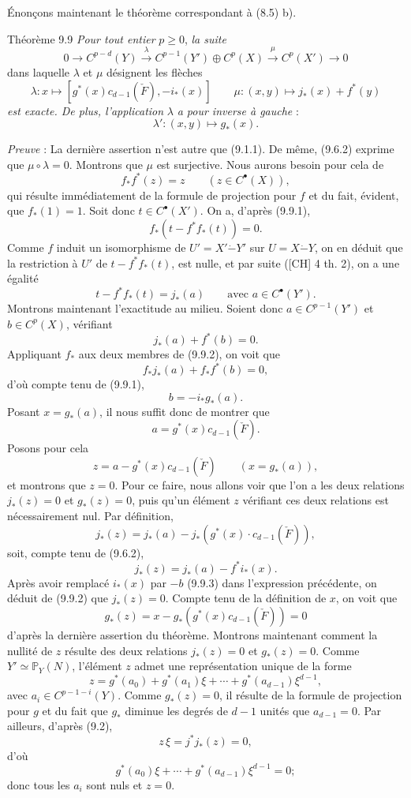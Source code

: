 Énonçons maintenant le théorème correspondant à (8.5) b).

\begin{statement}{Théorème 9.9}
\emph{Pour tout entier} $p\ge0$, \emph{la suite}
\[
0\to C^{p-d}(Y)\xrightarrow{\lambda} C^{p-1}(Y')\oplus C^p(X)\xrightarrow{\mu} C^p(X')\to0
\]
dans laquelle $\lambda$ et $\mu$ désignent les flèches
\[
\lambda:x\mapsto[g^*(x)c_{d-1}(\check F),-i_*(x)]
\qquad
\mu:(x,y)\mapsto j_*(x)+f^*(y)
\]
\emph{est exacte. De plus, l'application} $\lambda$ \emph{a pour inverse à gauche} :
\[
\lambda':(x,y)\mapsto g_*(x).
\]
\end{statement}

\emph{Preuve} : La dernière assertion n'est autre que (9.1.1). De même, (9.6.2) exprime que $\mu\circ\lambda=0$. Montrons que $\mu$ est surjective. Nous aurons besoin pour cela de
\[
f_*f^*(z)=z\qquad(z\in C^{\bullet}(X)),
\tag{9.9.1}
\]
qui résulte immédiatement de la formule de projection pour $f$ et du fait, évident, que $f_*(1)=1$. Soit donc $t\in C^{\bullet}(X')$. On a, d'après (9.9.1),
\[
f_*(t-f^*f_*(t))=0.
\]
Comme $f$ induit un isomorphisme de $U'=X'\mathbin{\dot{-}}Y'$ sur $U=X\mathbin{\dot{-}}Y$, on en déduit que la
restriction à $U'$ de $t-f^*f_*(t)$, est nulle, et par suite ([CH] 4 th. 2), on a une égalité
\[
t-f^*f_*(t)=j_*(a)
\qquad\text{avec }a\in C^{\bullet}(Y').
\]
Montrons maintenant l'exactitude au milieu. Soient donc $a\in C^{p-1}(Y')$ et $b\in C^p(X)$, vérifiant
\[
j_*(a)+f^*(b)=0.
\tag{9.9.2}
\]
Appliquant $f_*$ aux deux membres de (9.9.2), on voit que
\[
f_*j_*(a)+f_*f^*(b)=0,
\]
d'où compte tenu de (9.9.1),
\[
b=-i_*g_*(a).
\tag{9.9.3}
\]
Posant $x=g_*(a)$, il nous suffit donc de montrer que
\[
a=g^*(x)c_{d-1}(\check F).
\tag{9.9.4}
\]
Posons pour cela
\[
z=a-g^*(x)c_{d-1}(\check F)\qquad(x=g_*(a)),
\]
et montrons que $z=0$. Pour ce faire, nous allons voir que l'on a les deux relations $j_*(z)=0$ et $g_*(z)=0$, puis qu'un élément $z$ vérifiant ces deux relations est nécessairement nul. Par définition,
\[
j_*(z)=j_*(a)-j_*(g^*(x)\cdot c_{d-1}(\check F)),
\]
soit, compte tenu de (9.6.2),
\[
j_*(z)=j_*(a)-f^*i_*(x).
\]
Après avoir remplacé $i_*(x)$ par $-b$ (9.9.3) dans l'expression précédente, on déduit de (9.9.2) que $j_*(z)=0$. Compte tenu de la définition de $x$, on voit que
\[
g_*(z)=x-g_*(g^*(x)c_{d-1}(\check F))=0
\]
d'après la dernière assertion du théorème. Montrons maintenant comment la nullité 
de $z$
résulte des deux relations $j_*(z)=0$ et $g_*(z)=0$. Comme $Y'\simeq\mathbb{P}_Y(N)$, l'élément $z$ admet une représentation unique de la forme
\[
z=g^*(a_0)+g^*(a_1)\xi+\cdots+g^*(a_{d-1})\xi^{d-1},
\]
avec $a_i\in C^{p-1-i}(Y)$. Comme $g_*(z)=0$, il résulte de la formule de projection pour $g$ et du fait que $g_*$ diminue les degrés de $d-1$ unités que $a_{d-1}=0$. Par ailleurs, d'après (9.2),
\[
z\,\xi=j^*j_*(z)=0,
\]
d'où
\[
g^*(a_0)\xi+\cdots+g^*(a_{d-1})\xi^{d-1}=0;
\]
donc tous les $a_i$ sont nuls et $z=0$.

